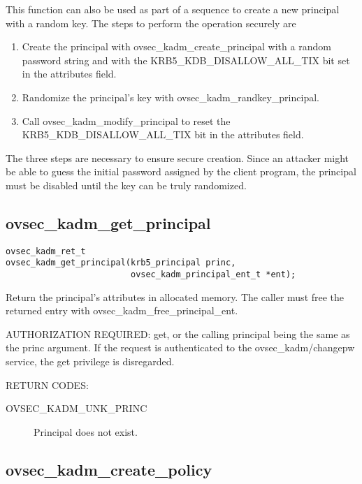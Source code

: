 This function can also be used as part of a sequence to create a new
principal with a random key.  The steps to perform the operation
securely are

\begin{enumerate}
\item Create the principal with ovsec_kadm_create_principal with a
random password string and with the KRB5_KDB_DISALLOW_ALL_TIX bit set
in the attributes field.

\item Randomize the principal's key with ovsec_kadm_randkey_principal.

\item Call ovsec_kadm_modify_principal to reset the
KRB5_KDB_DISALLOW_ALL_TIX bit in the attributes field.
\end{enumerate}

The three steps are necessary to ensure secure creation.  Since an
attacker might be able to guess the initial password assigned by the
client program, the principal must be disabled until the key can be
truly randomized.

\subsection{ovsec_kadm_get_principal}

\begin{verbatim}
ovsec_kadm_ret_t
ovsec_kadm_get_principal(krb5_principal princ, 
                         ovsec_kadm_principal_ent_t *ent);  
\end{verbatim}

Return the principal's attributes in allocated memory.  The caller
must free the returned entry with ovsec_kadm_free_principal_ent.

AUTHORIZATION REQUIRED: get, or the calling principal being the same
as the princ argument.  If the request is authenticated to the
ovsec_kadm/changepw service, the get privilege is disregarded.


RETURN CODES:

\begin{description}
\item[OVSEC_KADM_UNK_PRINC] Principal does not exist.
\end{description}

\subsection{ovsec_kadm_create_policy}


